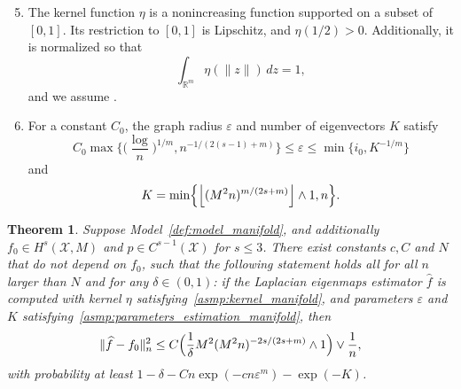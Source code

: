 \documentclass{article}
\newcommand{\Reals}{\mathbb{R}}
\newcommand{\floor}[1]{\left\lfloor #1 \right\rfloor}
\newcommand{\1}{\mathbf{1}}
\newcommand{\mc}[1]{\mathcal{#1}}
\newcommand{\wh}[1]{\widehat{#1}}
\theoremstyle{alden}
\theoremstyle{aldenthm}
\newtheorem{theorem}{Theorem}
\theoremstyle{definition}
\theoremstyle{remark}
\begin{document}
\begin{enumerate}[label=(P\arabic*)]
	\setcounter{enumi}{4}
	\item 
	\label{asmp:kernel_manifold}
	The kernel function $\eta$ is a nonincreasing function supported on a subset of $[0,1]$. Its restriction to $[0,1]$ is Lipschitz, and $\eta(1/2) > 0$. Additionally, it is normalized so that
	\begin{equation*}
	\int_{\Reals^m} \eta(\|z\|) \,dz = 1,
	\end{equation*}
	and we assume \smash{$\int_{\Reals^m} \|x\|^2 \eta(\|x\|) \,dx < \infty$}.
	\item 
	\label{asmp:parameters_estimation_manifold}
	For a constant $C_0$, the graph radius $\varepsilon$ and number of eigenvectors $K$ satisfy
	\begin{equation}
	\label{eqn:radius_estimation_manifold}
	C_0\max\biggl\{\biggl(\frac{\log}{n}\biggr)^{1/m}, n^{-1/(2(s - 1) + m)}\biggr\} \leq \varepsilon \leq \min\{i_0, K^{-1/m}\}
	\end{equation}
	and
	\begin{equation*}
	K = \min\Bigl\{\floor{(M^2n)^{m/(2s + m)}} \wedge 1,n \Bigr\}.
	\end{equation*}
\end{enumerate}

\begin{theorem}
	\label{thm:laplacian_eigenmaps_estimation_manifold}
	Suppose Model~\ref{def:model_manifold}, and additionally $f_0 \in H^s(\mc{X},M)$ and $p \in C^{s - 1}(\mc{X})$ for $s \leq 3$. There exist constants $c,C$ and $N$ that do not depend on $f_0$, such that the following statement holds all for all $n$ larger than $N$ and for any $\delta \in (0,1)$: if the Laplacian eigenmaps estimator $\wh{f}$ is computed with kernel $\eta$ satisfying~\ref{asmp:kernel_manifold}, and parameters $\varepsilon$ and $K$ satisfying~\ref{asmp:parameters_estimation_manifold}, then
	\begin{equation}
	\label{eqn:laplacian_eigenmaps_estimation_manifold}
	\|\wh{f} - f_0\|_n^2 \leq C\Bigl(\frac{1}{\delta}M^2(M^2n)^{-2s/(2s + m)} \wedge 1\Bigr) \vee \frac{1}{n},
	\end{equation}
	with probability at least $1 - \delta - Cn\exp(-cn\varepsilon^m) - \exp(-K)$.
\end{theorem}
\end{document}
